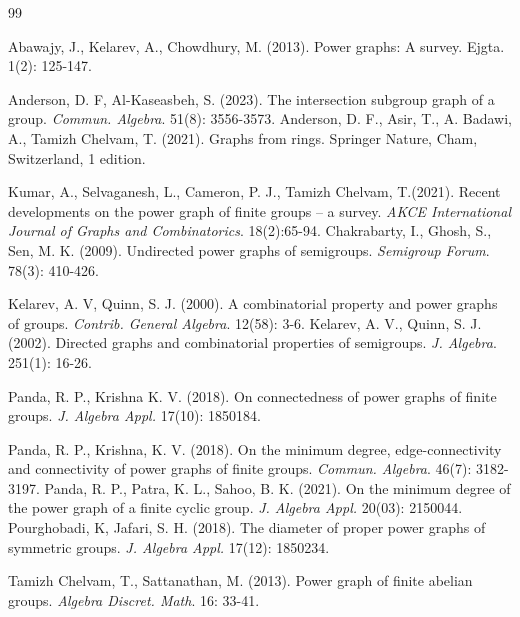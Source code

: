 \documentclass{amsart}
\theoremstyle{plain}
\begin{document}
\begin{thebibliography}{99}
	
	
	 Abawajy, J., Kelarev, A., Chowdhury, M. (2013). Power graphs:	A survey. Ejgta. 1(2): 125-147.
	
	 Anderson, D. F, Al-Kaseasbeh, S. (2023). The intersection subgroup graph of a group. {\it Commun. Algebra}. 51(8): 3556-3573.
	 Anderson, D. F., Asir, T., A. Badawi, A., Tamizh Chelvam, T. (2021). Graphs from rings. Springer Nature, Cham, Switzerland, 1 edition.
		
 Kumar, A., Selvaganesh, L., Cameron, P. J., Tamizh Chelvam, T.(2021). Recent developments on the power graph of finite groups – a survey. {\it AKCE International Journal of Graphs and Combinatorics}. 18(2):65-94.
 Chakrabarty, I., Ghosh, S., Sen, M. K. (2009). Undirected power graphs of semigroups. {\it Semigroup Forum}. 78(3): 410-426.


 Kelarev, A. V, Quinn, S. J. (2000). A combinatorial property
and power graphs of groups. {\it Contrib. General Algebra}. 12(58):
3-6.
 Kelarev, A. V., Quinn, S. J. (2002). Directed graphs and combinatorial properties of semigroups. {\it J. Algebra}. 251(1): 16-26.

	 Panda, R. P., Krishna K. V. (2018). On connectedness of power graphs of finite groups. {\it J. Algebra Appl.} 17(10): 1850184.
	
 Panda, R. P., Krishna, K. V. (2018). On the minimum degree,
	edge-connectivity and connectivity of power graphs of finite
	groups. {\it Commun. Algebra}. 46(7): 3182-3197.
	 Panda, R. P., Patra, K. L., Sahoo, B. K. (2021). On the minimum degree of the power graph of a finite cyclic group. {\it J. Algebra Appl.} 20(03): 2150044.
	 Pourghobadi, K, Jafari, S. H. (2018). The diameter of proper power graphs of symmetric groups. {\it J. Algebra Appl.} 17(12): 1850234.
	
	 Tamizh Chelvam, T., Sattanathan, M. (2013). Power graph of finite abelian groups. {\it Algebra Discret. Math}. 16: 33-41.

	
\end{thebibliography}
\end{document}

